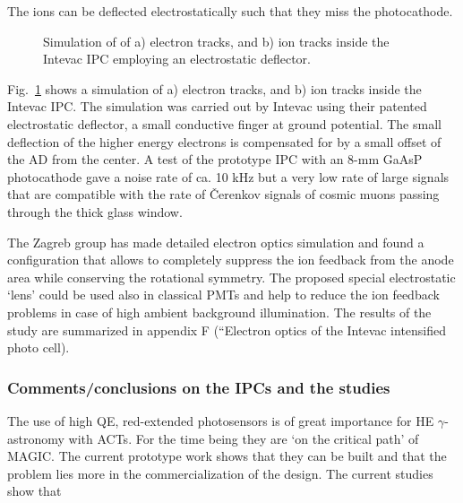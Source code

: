 The ions can be deflected electrostatically such that they miss the
photocathode. 
\begin{figure}[htb]
\begin{center}
\vspace{1cm}
\caption{Simulation of of a) electron tracks, and b) ion tracks
inside the Intevac IPC employing an electrostatic deflector.}
\label{fig-intevac_simul}
\end{center}
\end{figure}

Fig.~\ref{fig-intevac_simul} 
shows a simulation of a) electron tracks, and b) ion tracks
inside the Intevac IPC. The simulation
was carried out by Intevac using their patented 
electrostatic deflector, a small conductive
finger at ground potential. The small deflection of the higher energy
electrons is compensated for by a small offset of the AD from the center. A
test of the prototype IPC with an 8-mm GaAsP photocathode gave a noise rate
of ca. 10 kHz but a very low rate of large signals that are compatible with
the rate of \v{C}erenkov signals of cosmic muons passing through the thick glass
window.

The Zagreb group has made detailed electron optics simulation and found a
configuration that allows to completely suppress the ion feedback from the
anode area while conserving the rotational symmetry. The proposed special
electrostatic `lens' could be used also in classical PMTs and help to reduce
the ion feedback problems in case of high ambient background illumination.
The results of the study are summarized in appendix F (``Electron optics
of the Intevac intensified photo cell).

\subsubsection{Comments/conclusions on the IPCs and the studies}


\medskip The use of high QE, red-extended photosensors is of great
importance for HE $\gamma$-astronomy with ACTs. For the time being they are
`on the critical path' of MAGIC. The current prototype work shows that they
can be built and that the problem lies more in the commercialization of the
design. The current studies show that

